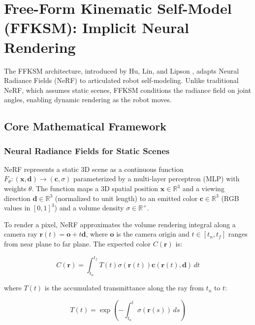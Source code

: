 \documentclass[12pt,a4paper,oneside]{report}
\begin{document}
\section{Free-Form Kinematic Self-Model (FFKSM): Implicit Neural Rendering}

The FFKSM architecture, introduced by Hu, Lin, and Lipson \cite{hu2024teaching}, adapts Neural Radiance Fields (NeRF) \cite{mildenhall2020nerf} to articulated robot self-modeling. Unlike traditional NeRF, which assumes static scenes, FFKSM conditions the radiance field on joint angles, enabling dynamic rendering as the robot moves.

\subsection{Core Mathematical Framework}
\label{subsec:core_mathematical_framework}

\subsubsection{Neural Radiance Fields for Static Scenes}
\label{subsubsec:neural_radiance_fields_for_static_scenes}

NeRF represents a static 3D scene as a continuous function $F_\theta: (\mathbf{x}, \mathbf{d}) \rightarrow (\mathbf{c}, \sigma)$ parameterized by a multi-layer perceptron (MLP) with weights $\theta$. The function maps a 3D spatial position $\mathbf{x} \in \mathbb{R}^3$ and a viewing direction $\mathbf{d} \in \mathbb{R}^3$ (normalized to unit length) to an emitted color $\mathbf{c} \in \mathbb{R}^3$ (RGB values in $[0,1]^3$) and a volume density $\sigma \in \mathbb{R}^+$.

To render a pixel, NeRF approximates the volume rendering integral along a camera ray $\mathbf{r}(t) = \mathbf{o} + t\mathbf{d}$, where $\mathbf{o}$ is the camera origin and $t \in [t_n, t_f]$ ranges from near plane to far plane. The expected color $C(\mathbf{r})$ is:

\begin{equation}
C(\mathbf{r}) = \int_{t_n}^{t_f} T(t) \sigma(\mathbf{r}(t)) \mathbf{c}(\mathbf{r}(t), \mathbf{d}) \, dt
\end{equation}

where $T(t)$ is the accumulated transmittance along the ray from $t_n$ to $t$:

\begin{equation}
T(t) = \exp\left(-\int_{t_n}^{t} \sigma(\mathbf{r}(s)) \, ds\right)
\end{equation}
\end{document}
